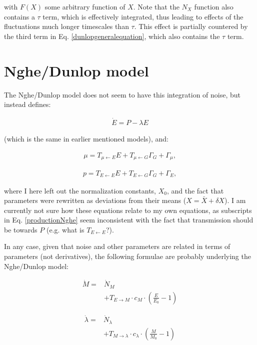 \documentclass[a4paper,twoside,10pt]{report}
\begin{document}
with $F(X)$ some arbitrary function of $X$. 
Note that the $N_X$ function also contains a $\tau$ term, which is effectively integrated, thus leading to effects of the fluctuations much longer timescales than $\tau$. 
This effect is partially countered by the third term in Eq. \ref{dunlopgeneralequation}, which also contains the $\tau$ term.

\section{Nghe/Dunlop model}

The Nghe/Dunlop model does not seem to have this integration of noise, but instead defines:


\begin{align}
\dot{E} = P - \lambda E
\end{align}

(which is the same in earlier mentioned models), and:

\begin{align}
\mu = T_{\mu \leftarrow E} E + T_{\mu \leftarrow G} \Gamma_G + \Gamma_\mu
,
\end{align}

\begin{align}
\label{productionNghe}
p = T_{E \leftarrow E} E + T_{E \leftarrow G} \Gamma_G + \Gamma_E
,
\end{align}

where I here left out the normalization constants, $X_0$, and the fact that parameters were rewritten as deviations from their means ($X=\bar{X}+\delta{X}$).
I am currently not sure how these equations relate to my own equations, as subscripts in Eq. \ref{productionNghe} seem inconsistent with the fact that transmission should be towards $P$ (e.g. what is $T_{E\leftarrow E}$?).

In any case, given that noise and other parameters are related in terms of parameters (not derivatives), the following formulae are probably underlying the Nghe/Dunlop model:

\begin{align}
\dot{M} = & \dot{N}_M  \nonumber \\ 
& + T_{E\rightarrow M} \cdot c_M \cdot (\frac{E}{E_0} - 1)  
\end{align}

\begin{align}
\dot{\lambda} = & \dot{N}_\lambda \nonumber \\ 
& +    T_{M\rightarrow\lambda} \cdot c_\lambda \cdot (\frac{M}{M_0}-1) 
\end{align}
\end{document}
